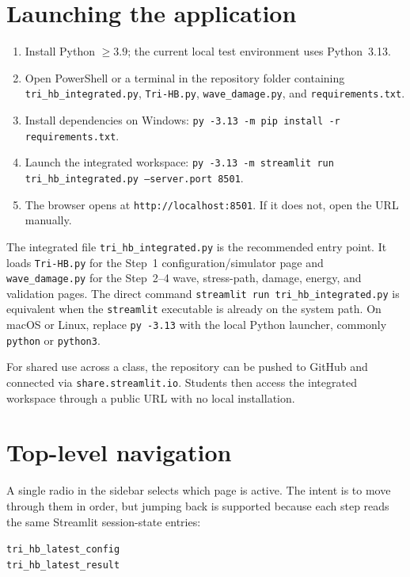 \documentclass[11pt,a4paper,openany]{book}
\theoremstyle{handbook}
\begin{document}
\section{Launching the application}

\begin{stepbox}
\begin{enumerate}[leftmargin=*,itemsep=3pt]
  \item Install Python $\ge 3.9$; the current local test environment uses
        Python~3.13.
  \item Open PowerShell or a terminal in the repository folder containing
        \texttt{tri\_hb\_integrated.py}, \texttt{Tri-HB.py},
        \texttt{wave\_damage.py}, and \texttt{requirements.txt}.
  \item Install dependencies on Windows:
        \texttt{py -3.13 -m pip install -r requirements.txt}.
  \item Launch the integrated workspace:
        \texttt{py -3.13 -m streamlit run tri\_hb\_integrated.py --server.port 8501}.
  \item The browser opens at \texttt{http://localhost:8501}. If it does
        not, open the URL manually.
\end{enumerate}
\end{stepbox}

\noindent The integrated file \texttt{tri\_hb\_integrated.py} is the
recommended entry point. It loads \texttt{Tri-HB.py} for the Step~1
configuration/simulator page and \texttt{wave\_damage.py} for the Step~2--4
wave, stress-path, damage, energy, and validation pages. The direct command
\texttt{streamlit run tri\_hb\_integrated.py} is equivalent when the
\texttt{streamlit} executable is already on the system path. On macOS or
Linux, replace \texttt{py -3.13} with the local Python launcher, commonly
\texttt{python} or \texttt{python3}.

For shared use across a class, the repository can be pushed to GitHub and
connected via \texttt{share.streamlit.io}. Students then access the
integrated workspace through a public URL with no local installation.

\section{Top-level navigation}

A single radio in the sidebar selects which page is active. The intent is
to move through them in order, but jumping back is supported because each
step reads the same Streamlit session-state entries:
\begin{center}
  \texttt{tri\_hb\_latest\_config}\\
  \texttt{tri\_hb\_latest\_result}
\end{center}
\end{document}
